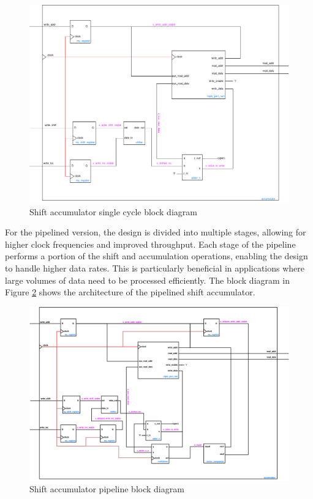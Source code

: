 \documentclass[a4paper,12pt]{article}
\begin{document}
\begin{figure}[H]
    \centering
    \includegraphics[width=1.0\linewidth]{accumulator_shift_single_cycle.png}
    \caption{Shift accumulator single cycle block diagram}
    \label{fig:shift}
\end{figure}

For the pipelined version, the design is divided into multiple stages, allowing for higher clock frequencies and improved throughput. Each stage of the pipeline performs a portion of the shift and accumulation operations, enabling the design to handle higher data rates. This is particularly beneficial in applications where large volumes of data need to be processed efficiently. The block diagram in Figure \ref{fig:shift_pipeline} shows the architecture of the pipelined shift accumulator.

\begin{figure}[H]
    \centering
    \includegraphics[width=1.0\linewidth]{accumulator_shift_pipeline.png}
    \caption{Shift accumulator pipeline block diagram}
    \label{fig:shift_pipeline}
\end{figure}
\end{document}

